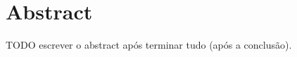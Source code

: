 \documentclass[12pt,twoside,openright]{report}
\begin{document}
\chapter*{Abstract}
TODO escrever o abstract após terminar tudo (após a conclusão).\\

\tableofcontents
{}

















\printbibliography
\end{document}
